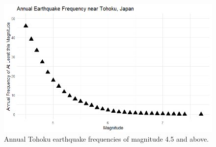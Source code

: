 \begin{figure}[H]
    \center
    \includegraphics[width=0.75\linewidth]{Figures/tohoku_standardscale.png}
    \caption{\footnotesize{Annual Tohoku earthquake frequencies of magnitude 4.5 and above.}}
    \label{tohoku_unfit}
\end{figure}






